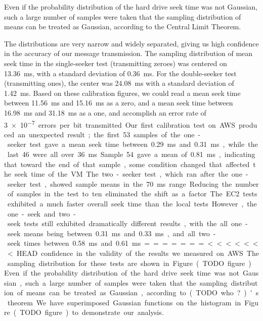 \documentclass[conference]{IEEEtran}
\begin{document}
Even if the probability distribution of the hard drive seek time was not Gaussian, such a large number of samples were
  taken that the sampling distribution of means can be treated as Gaussian, according to the Central Limit Theorem.

The distributions are very narrow and widely separated, giving us high confidence in the accuracy of our message
  transmission.
The sampling distribution of mean seek time in the single-seeker test (transmitting zeroes) was centered on
  \SI{13.36}{ms}, with a standard deviation of \SI{0.36}{ms}.
For the double-seeker test (transmitting ones), the center was \SI{24.08}{ms} with a standard deviation of
  \SI{1.42}{ms}.
Based on these calibration figures, we could read a mean seek time between \SI{11.56}{ms} and \SI{15.16}{ms}
  as a zero, and a mean seek time between \SI{16.98}{ms} and \SI{31.18}{ms} as a one, and accomplish an error rate of
  \SI{3e-7} errors per bit transmitted.

Our first calibration test on AWS produced an unexpected result; the first \num{53} samples of the one-seeker test gave
  a mean seek time between \SI{0.29}{ms} and \SI{0.31}{ms}, while the last \num{46} were all over \SI{36}{ms}.
Sample \num{54} gave a mean of \SI{0.81}{ms}, indicating that toward the end of that sample, some condition changed
  that affected the seek time of the VM.
The two-seeker test, which ran after the one-seeker test, showed sample means in the \SI{70}{ms} range.

Reducing the number of samples in the test to ten eliminated the shift as a factor.
The EC2 tests exhibited a much faster overall seek time than the local tests.
However, the one-seek and two-seek tests still exhibited dramatically different results, with the all one-seek means
  being between \SI{0.31}{ms} and \SI{0.33}{ms}, and all two-seek times between \SI{0.58}{ms} and \SI{0.61}{ms}.

=======
<<<<<<< HEAD
  confidence in the validity of the results we measured on AWS. The sampling distribution for these tests are shown in
  Figure~(TODO figure).

Even if the probability distribution of the hard drive seek time was not Gaussian, such a large number of samples were
  taken that the sampling distribution of means can be treated as Gaussian, according to (TODO who?)'s theorem.
We have superimposed Gaussian functions on the histogram in Figure~(TODO figure) to demonstrate our analysis.
\end{document}
